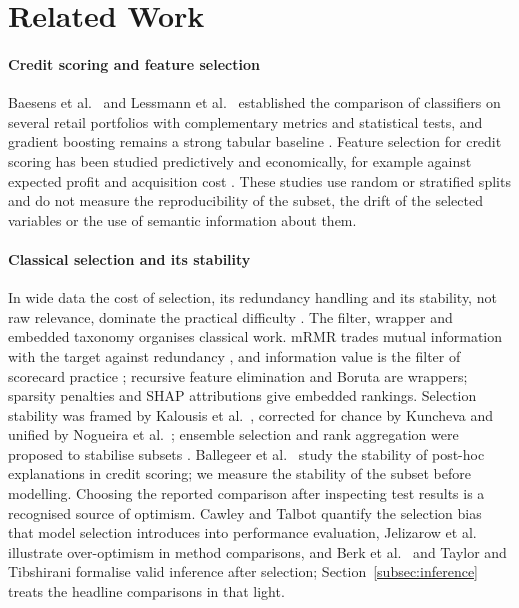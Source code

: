\documentclass[final,5p,twocolumn]{elsarticle}
\begin{document}

\section{Related Work}
\label{sec:related_work}

\paragraph{Credit scoring and feature selection}
Baesens et al.\ \cite{baesens2003} and Lessmann et al.\ \cite{lessmann2015} established the comparison of classifiers on several retail portfolios with complementary metrics and statistical tests, and gradient boosting remains a strong tabular baseline \cite{gunnarsson2021}. Feature selection for credit scoring has been studied predictively and economically, for example against expected profit and acquisition cost \cite{maldonado2017}. These studies use random or stratified splits and do not measure the reproducibility of the subset, the drift of the selected variables or the use of semantic information about them.

\paragraph{Classical selection and its stability}
In wide data the cost of selection, its redundancy handling and its stability, not raw relevance, dominate the practical difficulty \cite{boloncanedo2015}. The filter, wrapper and embedded taxonomy \cite{kohavi1997,guyon2003} organises classical work. mRMR trades mutual information with the target against redundancy \cite{peng2005}, and information value is the filter of scorecard practice \cite{siddiqi2006}; recursive feature elimination \cite{guyon2002} and Boruta \cite{kursa2010,breiman2001} are wrappers; sparsity penalties \cite{tibshirani1996} and SHAP attributions \cite{lundberg2017} give embedded rankings. Selection stability was framed by Kalousis et al.\ \cite{kalousis2007}, corrected for chance by Kuncheva \cite{kuncheva2007} and unified by Nogueira et al.\ \cite{nogueira2018}; ensemble selection and rank aggregation were proposed to stabilise subsets \cite{saeys2008,dwork2001}. Ballegeer et al.\ \cite{ballegeer2025} study the stability of post-hoc explanations in credit scoring; we measure the stability of the subset before modelling. Choosing the reported comparison after inspecting test results is a recognised source of optimism. Cawley and Talbot \cite{cawley2010} quantify the selection bias that model selection introduces into performance evaluation, Jelizarow et al.\ \cite{jelizarow2010} illustrate over-optimism in method comparisons, and Berk et al.\ \cite{berk2013} and Taylor and Tibshirani \cite{taylor2015} formalise valid inference after selection; Section~\ref{subsec:inference} treats the headline comparisons in that light.
\end{document}
